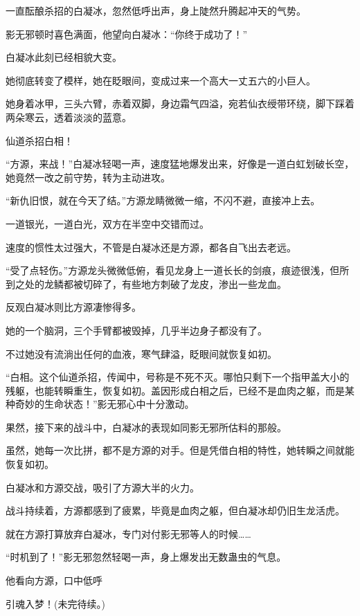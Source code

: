 \begin{this_body}
一直酝酿杀招的白凝冰，忽然低呼出声，身上陡然升腾起冲天的气势。

影无邪顿时喜色满面，他望向白凝冰：“你终于成功了！”

白凝冰此刻已经相貌大变。

她彻底转变了模样，她在眨眼间，变成过来一个高大一丈五六的小巨人。

她身着冰甲，三头六臂，赤着双脚，身边霜气四溢，宛若仙衣绶带环绕，脚下踩着两朵寒云，透着淡淡的蓝意。

仙道杀招白相！

“方源，来战！”白凝冰轻喝一声，速度猛地爆发出来，好像是一道白虹划破长空，她竟然一改之前守势，转为主动进攻。

“新仇旧恨，就在今天了结。”方源龙睛微微一缩，不闪不避，直接冲上去。

一道银光，一道白光，双方在半空中交错而过。

速度的惯性太过强大，不管是白凝冰还是方源，都各自飞出去老远。

“受了点轻伤。”方源龙头微微低俯，看见龙身上一道长长的剑痕，痕迹很浅，但所到之处的龙鳞都被切碎了，有些地方刺破了龙皮，渗出一些龙血。

反观白凝冰则比方源凄惨得多。

她的一个脑洞，三个手臂都被毁掉，几乎半边身子都没有了。

不过她没有流淌出任何的血液，寒气肆溢，眨眼间就恢复如初。

“白相。这个仙道杀招，传闻中，号称是不死不灭。哪怕只剩下一个指甲盖大小的残躯，也能转瞬重生，恢复如初。盖因形成白相之后，已经不是血肉之躯，而是某种奇妙的生命状态！”影无邪心中十分激动。

果然，接下来的战斗中，白凝冰的表现如同影无邪所估料的那般。

虽然，她每一次比拼，都不是方源的对手。但是凭借白相的特性，她转瞬之间就能恢复如初。

白凝冰和方源交战，吸引了方源大半的火力。

战斗持续着，方源都感到了疲累，毕竟是血肉之躯，但白凝冰却仍旧生龙活虎。

就在方源打算放弃白凝冰，专门对付影无邪等人的时候……

“时机到了！”影无邪忽然轻喝一声，身上爆发出无数蛊虫的气息。

他看向方源，口中低呼

引魂入梦！(未完待续。)

\end{this_body}

